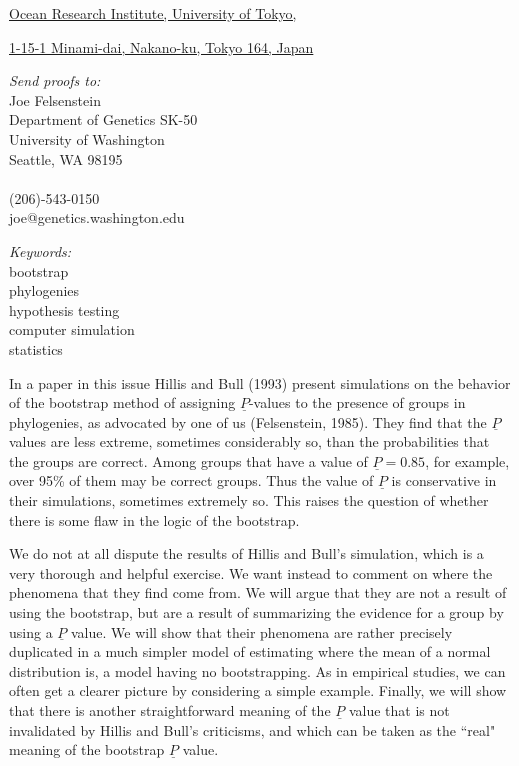 \centerline{\footnotemark[2]\underline{Ocean Research Institute, University of Tokyo,}}
\centerline{\underline{1-15-1 Minami-dai, Nakano-ku, Tokyo 164, Japan}}
\bigskip
\vfill
{
\parbox[b]{2.5in}{
{\em Send proofs to:} \\
Joe Felsenstein\\
Department of Genetics SK-50\\
University of Washington\\
Seattle, WA 98195\\
\\
(206)-543-0150\\
joe@genetics.washington.edu
}
\hfill
\parbox[b]{2.0in}{
{\em Keywords:}\\
bootstrap\\
phylogenies\\
hypothesis testing\\
computer simulation\\
statistics
}
\newpage

In a paper in this issue Hillis and Bull (1993) present simulations on the
behavior of the bootstrap method of assigning $\underline{P}$-values to the presence of
groups in phylogenies, as advocated by one of us (Felsenstein, 1985).  They
find that the $\underline{P}$ values are less extreme, sometimes considerably so, than
the probabilities that the groups are correct.  Among groups that have a
value of $\underline{P} = 0.85$, for example, over 95\% of them may be correct
groups.  Thus the value of $\underline{P}$ is conservative in their simulations,
sometimes extremely so.  This raises the question of whether there is
some flaw in the logic of the bootstrap.

We do not at all dispute the results of Hillis and Bull's simulation,
which is a very thorough and helpful exercise.  We want instead to comment
on where the phenomena that they find come from.  We will argue that they
are not a result of using the bootstrap, but are a result of summarizing
the evidence for a group by using a $\underline{P}$ value.  We will show that their
phenomena are rather precisely duplicated in a much simpler model of
estimating where the mean of a normal distribution is, a model having no
bootstrapping.  As in empirical studies, we can often get a clearer
picture by considering a simple example.  Finally, we will show that there is
another straightforward meaning of the $\underline{P}$ value that is not invalidated by
Hillis and Bull's criticisms, and which can be taken as the ``real" meaning of
the bootstrap $\underline{P}$ value.

}
